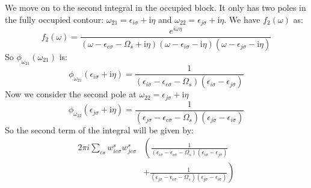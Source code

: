 \documentclass[12pt]{article}
\begin{document}
We move on to the second integral in the occupied block. It only has two poles in the fully occupied contour: $\omega_{21} = \epsilon _{i\sigma } + \mathrm{i} \eta$ and $\omega_{22} = \epsilon _{j\sigma } + \mathrm{i} \eta$. We have $f_2(\omega)$ as:
\begin{equation}
f_2(\omega) = \frac{e^{i\omega \eta }}{(\omega-\epsilon_{c \sigma}-\Omega_s+\mathrm{i} \eta)(\omega-\epsilon_{i \sigma}-\mathrm{i} \eta)(\omega-\epsilon_{j \sigma}-\mathrm{i} \eta)}
\end{equation}
So $\phi_{\omega_{21}}(\omega _{21})$ is:
\begin{equation}
\boxed{\phi_{\omega_{21}}(\epsilon_{i \sigma} + \mathrm{i} \eta) = \frac{1}{(\epsilon_{i \sigma} -\epsilon_{c \sigma}-\Omega_s)(\epsilon_{i \sigma} -\epsilon_{j \sigma})}}
\end{equation}
Now we consider the second pole at $\omega_{22} = \epsilon _{j\sigma } + \mathrm{i} \eta$
\begin{equation}
\boxed{\phi_{\omega_{22}}(\epsilon_{j \sigma} + \mathrm{i} \eta) = \frac{1}{(\epsilon_{j \sigma} -\epsilon_{c \sigma}-\Omega_s)(\epsilon_{j \sigma} -\epsilon_{i \sigma})}}
\end{equation}
So the second term of the integral will be given by:
\begin{equation}
\begin{aligned}
2\pi i \sum_{cs} w_{i c \sigma}^s w_{j c \sigma}^s & \left( \frac{1}{(\epsilon_{i \sigma} -\epsilon_{c \sigma}-\Omega_s)(\epsilon_{i \sigma} -\epsilon_{j \sigma})} \right. \\
& \left. + \frac{1}{(\epsilon_{j \sigma} -\epsilon_{c \sigma}-\Omega_s)(\epsilon_{j \sigma} -\epsilon_{i \sigma})} \right)
\end{aligned}
\end{equation}
\end{document}
